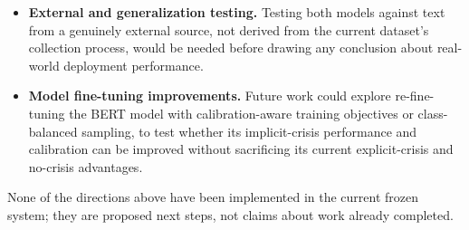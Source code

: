 \begin{itemize}[nosep,leftmargin=*]
  \item \textbf{External and generalization testing.} Testing both models against text from a genuinely external source, not derived from the current dataset's collection process, would be needed before drawing any conclusion about real-world deployment performance.

  \item \textbf{Model fine-tuning improvements.} Future work could explore re-fine-tuning the BERT model with calibration-aware training objectives or class-balanced sampling, to test whether its implicit-crisis performance and calibration can be improved without sacrificing its current explicit-crisis and no-crisis advantages.
\end{itemize}

None of the directions above have been implemented in the current frozen system; they are proposed next steps, not claims about work already completed.
